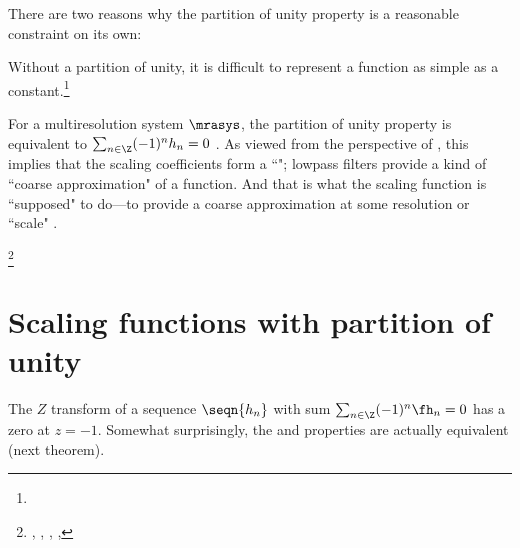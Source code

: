 There are two reasons why the partition of unity property is a reasonable
constraint on its own:
\begin{liste}
   \item Without a partition of unity, it is difficult to represent a function as simple as a
         constant.\footnote{}

  \item For a multiresolution system $\mrasys$, the partition of unity property is equivalent to
        $\sum_{n\in\Z} (-1)^n h_n = 0$ .
        As viewed from the perspective of  ,
        this implies that the scaling coefficients form a ``"; 
        lowpass filters provide a kind of ``coarse approximation"
        of a function. And that is what the scaling function is ``supposed" to do---to provide a coarse approximation 
        at some resolution or ``scale" .
\end{liste}

\begin{definition}
\footnote{
  ,
  ,
  ,
  ,
  }
\label{def:pun}
\end{definition}

\section{Scaling functions with partition of unity}

The $Z$ transform  of a sequence $\seqn{h_n}$ 
with sum $\sum_{n\in\Z} (-1)^n\fh_n=0$ has a zero at $z=-1$.
Somewhat surprisingly, the  and
 properties are actually equivalent (next theorem). 

